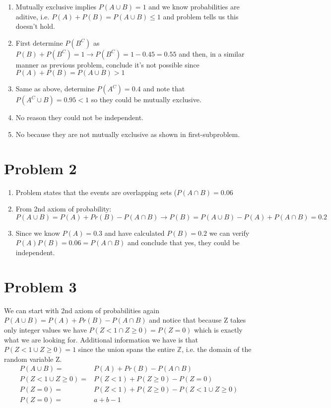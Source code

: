\documentclass{article}
\newcommand{\1}{\mathbf{1}}
\newcommand{\Z}{\mathbb{Z}}
\begin{document}
\begin{enumerate}
	\item Mutually exclusive implies $P(A\cup B)=1$ and we know probabilities are aditive, i.e. $P(A)+P(B)=P(A\cup B)\leq 1$ and problem tells us this doesn't hold.
	\item First determine $P(B^C)$ as $P(B)+P(B^C)=1 \rightarrow P(B^C)=1-0.45=0.55$ and then, in a similar manner as previous problem, conclude it's not possible since  $P(A)+P(B)=P(A\cup B) > 1$
	\item Same as above, determine $P(A^C)=0.4$ and note that $P(A^C\cup B)=0.95<1$ so they could be mutually exclusive.
	\item No reason they could not be independent. 
	\item No because they are not mutually exclusive as shown in first-subproblem.
\end{enumerate}

\section*{Problem 2}
\begin{enumerate}
	\item Problem states that the events are overlapping sets ($P(A\cap B) =0.06$
	\item From 2nd axiom of probability: $P(A\cup B) = P(A) + Pr(B) - P(A\cap B) \rightarrow P(B) = P(A\cup B)  - P(A) + P(A\cap B) = 0.2$
	\item Since we know $P(A)=0.3$ and have calculated $P(B)=0.2$ we can verify $P(A)P(B)=0.06=P(A\cap B)$ and conclude that yes, they could be independent.
\end{enumerate}


\section*{Problem 3}
We can start with 2nd axiom of probabilities again $P(A\cup B) = P(A) + Pr(B) - P(A\cap B)$ and notice that because Z takes only integer values we have $P(Z<1 \cap Z\geq 0) = P(Z=0)$ which is exactly what we are looking for. Additional information we have is that $P(Z<1 \cup Z\geq 0) = 1$ since the union spans the entire $\Z$, i.e. the domain of the random variable Z.
\begin{align*}
P(A\cup B) =& P(A) + Pr(B) - P(A\cap B) \\
P(Z<1 \cup Z\geq 0) =& P(Z<1) + P(Z\geq 0) - P(Z=0) \\
P(Z=0) =& P(Z<1) + P(Z\geq 0) - P(Z<1 \cup Z\geq 0) \\
P(Z=0) =& a + b - 1
\end{align*}
\end{document}

